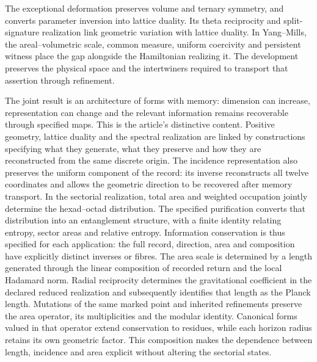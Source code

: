 The exceptional deformation preserves volume and ternary
symmetry, and converts parameter inversion into lattice
duality. Its theta reciprocity and split-signature realization
link geometric variation with lattice duality.
In Yang--Mills, the areal--volumetric scale, common measure,
uniform coercivity and persistent witness place the gap
alongside the Hamiltonian realizing it. The development preserves
the physical space and the intertwiners required to transport
that assertion through refinement.

The joint result is an architecture of forms with memory:
dimension can increase, representation can change and
the relevant information remains recoverable through
specified maps. This is the article's distinctive content.
Positive geometry, lattice duality and the spectral
realization are linked by constructions specifying
what they generate, what they preserve and how they are reconstructed
from the same discrete origin.
The incidence representation also preserves the uniform component
of the record: its inverse reconstructs all twelve coordinates and allows
the geometric direction to be recovered after memory transport.
In the sectorial realization, total area and weighted occupation
jointly determine the hexad--octad distribution. The specified
purification converts that distribution into an entanglement structure,
with a finite identity relating entropy, sector areas and relative entropy.
Information conservation is thus specified for each application:
the full record, direction, area and composition have explicitly
distinct inverses or fibres.
The area scale is determined by a length generated through the linear
composition of recorded return and the local Hadamard norm.
Radial reciprocity determines the gravitational coefficient in the
declared reduced realization and subsequently identifies that length as
the Planck length. Mutations of the same marked point and
inherited refinements preserve the area operator, its
multiplicities and the modular identity. Canonical forms
valued in that operator extend conservation to residues,
while each horizon radius retains its own geometric
factor. This composition makes the dependence between
length, incidence and area explicit without altering the sectorial states.
\par\endgroup
\clearpage

